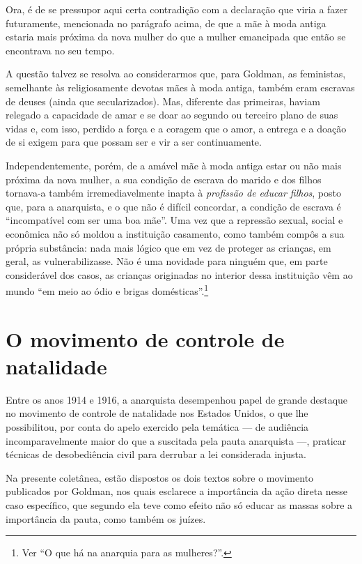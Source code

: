 Ora, é de se pressupor aqui certa contradição com a declaração que viria
a fazer futuramente, mencionada no parágrafo acima, de que a mãe à moda
antiga estaria mais próxima da nova mulher do que a mulher emancipada
que então se encontrava no seu tempo.

A questão talvez se resolva ao
considerarmos que, para Goldman, as feministas, semelhante às
religiosamente devotas mães à moda antiga, também eram escravas de deuses (ainda que secularizados). Mas,
diferente das primeiras, haviam relegado a capacidade de
amar e se doar ao segundo ou terceiro plano de suas vidas e, com isso,
perdido a força e a coragem que o amor, a entrega e a
doação de si exigem para que possam ser e vir a ser continuamente.

Independentemente, porém, de a amável mãe à moda antiga estar ou não
mais próxima da nova mulher, a sua condição de escrava do marido e
dos filhos tornava-a também irremediavelmente inapta à \textit{profissão de
educar filhos}, posto que, para a anarquista, e o que não é difícil
concordar, a condição de escrava é ``incompatível com ser uma boa mãe''.
Uma vez que a repressão sexual, social e econômica não só moldou a
instituição casamento, como também compôs a sua própria substância:
nada mais lógico que em vez de proteger as crianças, em geral, as
vulnerabilizasse. Não é uma novidade para ninguém que, em parte
considerável dos casos, as crianças originadas no interior dessa
instituição vêm ao mundo ``em meio ao ódio e brigas domésticas''.\footnote{Ver ``O
que há na anarquia para as mulheres?''.}

\section{O movimento de controle de natalidade}

Entre os anos 1914 e 1916, a anarquista desempenhou papel de grande
destaque no movimento de controle de natalidade nos Estados Unidos, o
que lhe possibilitou, por conta do apelo exercido pela temática --- de
audiência incomparavelmente maior do que a suscitada pela pauta
anarquista ---, praticar técnicas de desobediência civil para
derrubar a lei considerada injusta.

Na presente coletânea, estão
dispostos os dois textos sobre o movimento
publicados por Goldman, nos quais esclarece a importância da ação
direta nesse caso específico, que segundo ela teve como efeito não só
educar as massas sobre a importância da pauta, como também os juízes.

